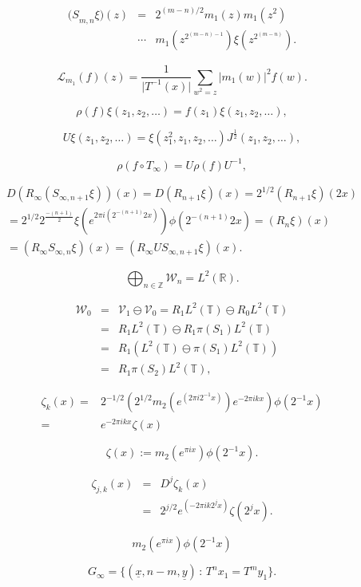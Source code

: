 \documentclass{article}
\begin{document}
\begin{eqnarray*}
{(S}_{m,n}\xi)(z) & = & 2^{(m-n)/2}m_{1}(z)m_{1}(z^{2})\\
 & \cdots & m_{1}(z^{2^{(m-n)-1}})\xi(z^{2^{(m-n)}}).\end{eqnarray*}

\[
\mathcal{L}_{m_{1}}(f)(z)=\frac{1}{\vert T^{-1}(x)\vert}\sum_{w^{2}=z}\vert
m_{1}(w)\vert^{2}f(w).\]

\[
\rho(f)\xi(z_{1},z_{2},\ldots)=f(z_{1})\xi(z_{1},z_{2},\ldots),\]

$$U\xi(z_{1},z_{2},\ldots)=\xi(z_{1}^{2},z_{1},z_{2},\ldots)J^{\frac{1}{2}}(z_{1}
,z_{2},\ldots),$$

\[
\rho(f\circ T_{\infty})=U\rho(f)U^{-1},\]

\begin{multline*}
D(R_{\infty}(S_{\infty,n+1}\xi))(x)=D(R_{n+1}\xi)(x)=2^{1/2}(R_{n+1}\xi)(2x)\\
=2^{1/2}2^{\frac{-(n+1)}{2}}\xi(e^{2\pi
i(2^{-(n+1)}2x)})\phi(2^{-(n+1)}2x)=(R_{n}\xi)(x)\\
=(R_{\infty}S_{\infty,n}\xi)(x)=(R_{\infty}US_{\infty,n+1}\xi)(x).
\end{multline*}

\[
\bigoplus_{n\in\mathbb{Z}}\mathcal{W}_{n}=L^{2}(\mathbb{R}).\]

\begin{eqnarray}
\mathcal{W}_{0} & = &
\mathcal{V}_{1}\ominus\mathcal{V}_{0}=R_{1}L^{2}(\mathbb{T})\ominus
R_{0}L^{2}(\mathbb{T})\label{eq:Wzero}\\
 & = & R_{1}L^{2}(\mathbb{T})\ominus R_{1}\pi(S_{1})L^{2}(\mathbb{T})\nonumber
\\
 & = & R_{1}(L^{2}(\mathbb{T})\ominus\pi(S_{1})L^{2}(\mathbb{T}))\nonumber \\
 & = & R_{1}\pi(S_{2})L^{2}(\mathbb{T}),\nonumber \end{eqnarray}

\begin{eqnarray*}
\zeta_{k}(x)= & 2^{-1/2}(2^{1/2}m_{2}(e^{(2\pi i2^{-1}x)})e^{-2\pi
ikx})\phi(2^{-1}x)\\
= & e^{-2\pi ikx}\zeta(x)\end{eqnarray*}

\[
\zeta(x):=m_{2}(e^{\pi ix})\phi(2^{-1}x).\]

\begin{eqnarray*}
\zeta_{j,k}(x) & = & D^{j}\zeta_{k}(x)\\
 & = & 2^{j/2}e^{(-2\pi ik2^{j}x)}\zeta(2^{j}x).\end{eqnarray*}

\[
m_{2}(e^{\pi ix})\phi(2^{-1}x)\]

\[
G_{\infty}=\{(\underline{x},n-m,\underline{y})\,:\, T^{n}x_{1}=T^{m}y_{1}\}.\]
\end{document}
